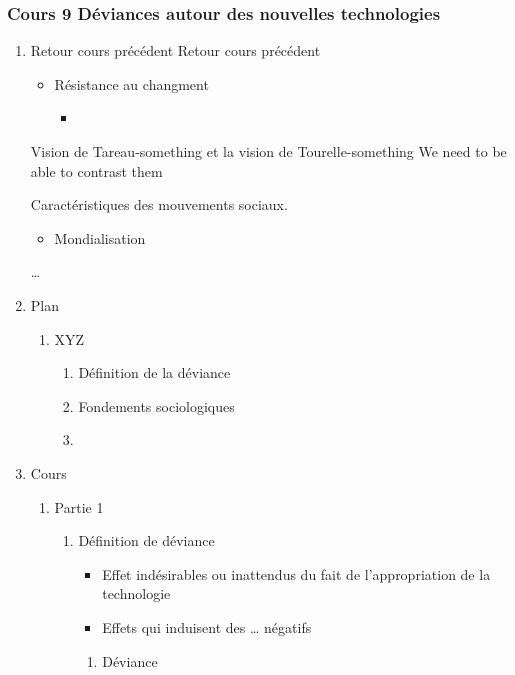 \documentclass[11pt]{article}
\begin{document}
\subsubsection{Cours 9 Déviances autour des nouvelles technologies}
\label{sec:orgd8030e3}
\begin{enumerate}
\item Retour cours précédent
\label{sec:orgbd23f85}
Retour cours précédent
\begin{itemize}
\item Résistance au changment
\begin{itemize}
\item 
\end{itemize}
\end{itemize}

Vision de Tareau-something et la vision de Tourelle-something
We need to be able to contrast them

Caractéristiques des mouvements sociaux.
\begin{itemize}
\item Mondialisation
\end{itemize}
\ldots{}
\item Plan
\label{sec:org9b6d8bb}
\begin{enumerate}
\item XYZ
\begin{enumerate}
\item Définition de la déviance
\item Fondements sociologiques
\item 
\end{enumerate}
\end{enumerate}

\item Cours
\label{sec:org40f836c}

\begin{enumerate}
\item Partie 1
\label{sec:org5b0d79c}
\begin{enumerate}
\item Définition de déviance
\label{sec:org945cfd1}
\begin{itemize}
\item Effet indésirables ou inattendus du fait de l'appropriation de la technologie
\item Effets qui induisent des \ldots{} négatifs
\end{itemize}

\begin{enumerate}
\item Déviance
\label{sec:orge7905f1}


\end{enumerate}
\end{enumerate}
\end{enumerate}
\end{enumerate}
\end{document}
